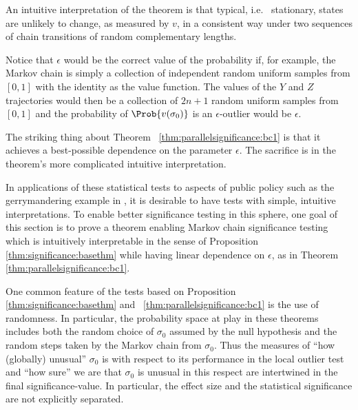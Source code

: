 \documentclass[12pt]{article}
\begin{document}
\begin{remark}
    An intuitive interpretation of the theorem is that typical, i.e.\ %
    stationary, states are unlikely to change, as measured by \( v \),
    in a consistent way under two sequences of chain transitions of
    random complementary lengths.
\end{remark}

\begin{remark}
    Notice that \( \epsilon \) would be the correct value of the
    probability if, for example, the Markov chain is simply a collection
    of independent random uniform samples from \( [0,1] \) with the
    identity as the value function.  The values of the \( Y \) and \( Z \)
    trajectories would then be a collection of \( 2n + 1 \) random
    uniform samples from \( [0,1] \) and the probability of \( \Prob{v(\sigma_0)}
    \) is an \( \epsilon \)-outlier would be \( \epsilon \).

    The striking thing about Theorem~%
    \ref{thm:parallelsignificance:bc1} is that it achieves a best-possible
    dependence on the parameter \( \epsilon \).  The sacrifice is in the
    theorem's more complicated intuitive interpretation.

    In applications of these statistical tests to aspects of public
    policy such as the gerrymandering example in , it is desirable to have tests with simple, intuitive
    interpretations.  To enable better significance testing in this
    sphere, one goal of this section is to prove a theorem enabling
    Markov chain significance testing which is intuitively interpretable
    in the sense of Proposition~%
    \ref{thm:significance:basethm} while having linear dependence on \(
    \epsilon \), as in Theorem~%
    \ref{thm:parallelsignificance:bc1}.
\end{remark}

\begin{remark}
    One common feature of the tests based on Proposition~%
    \ref{thm:significance:basethm} and~%
    \ref{thm:parallelsignificance:bc1} is the use of randomness.  In particular,
    the probability space at play in these theorems includes both the
    random choice of \( \sigma_0 \) assumed by the null hypothesis and
    the random steps taken by the Markov chain from \( \sigma_0 \).
    Thus the measures of ``how (globally) unusual'' \( \sigma_0 \) is
    with respect to its performance in the local outlier test and ``how
    sure'' we are that \( \sigma_0 \) is unusual in this respect are
    intertwined in the final significance-value.  In particular, the effect
    size and the statistical significance are not explicitly separated.
\end{remark}
\end{document}
